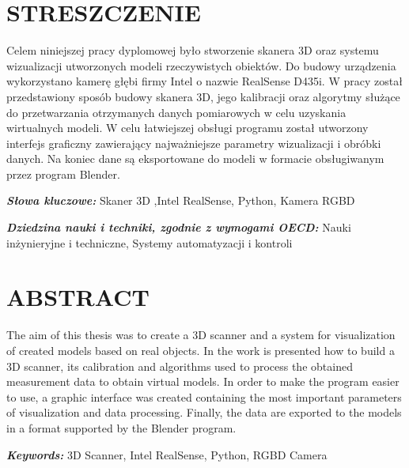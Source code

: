 \documentclass{pginz}
\providecommand{\keywordspl}[1]
{
  \small	
  \textbf{\textit{Słowa kluczowe:}} #1
}
\providecommand{\keywordseng}[1]
{
  \small	
  \textbf{\textit{Keywords:}} #1 
}
\providecommand{\dnauki}[1]
{
  \small	
  \textbf{\textit{Dziedzina nauki i techniki, zgodnie z wymogami OECD:}} #1
}
\begin{document}




\setcounter{page}{3}

 
\section*{STRESZCZENIE}
Celem niniejszej pracy dyplomowej było stworzenie skanera 3D oraz systemu wizualizacji utworzonych modeli rzeczywistych obiektów. Do budowy urządzenia wykorzystano kamerę głębi firmy Intel o nazwie RealSense D435i. W pracy został przedstawiony sposób budowy skanera 3D, jego kalibracji oraz algorytmy służące do przetwarzania otrzymanych danych pomiarowych w celu uzyskania wirtualnych modeli. W celu łatwiejszej obsługi programu został utworzony interfejs graficzny zawierający najważniejsze parametry wizualizacji i obróbki danych. Na koniec dane są eksportowane do modeli w formacie obsługiwanym przez program Blender.

\keywordspl{Skaner 3D ,Intel RealSense, Python, Kamera RGBD}

\dnauki{Nauki inżynieryjne i techniczne, Systemy automatyzacji i kontroli }

\section*{ABSTRACT}
The aim of this thesis was to create a 3D scanner and a system for visualization of created models based on real objects. In the work is presented how to build a 3D scanner, its calibration and algorithms used to process the obtained measurement data to obtain virtual models. In order to make the program easier to use, a graphic interface was created containing the most important parameters of visualization and data processing. Finally, the data are exported to the models in a format supported by the Blender program.

\keywordseng{3D Scanner, Intel RealSense, Python, RGBD Camera}
\newpage
\tableofcontents


\newpage








\renewcommand{\listtablename}{Spis tabel}
\renewcommand{\listfigurename}{Spis rysunków}
\listoffigures
\listoftables




\end{document}
